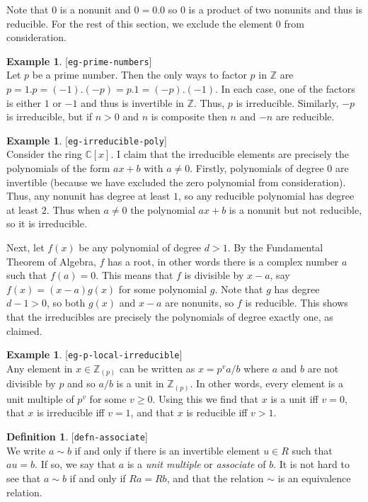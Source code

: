 \documentclass{amsart}
\newcommand{\lbl}[1]{\label{#1}\textup{[\texttt{#1}]}\ \\}
\newcommand{\lbl}{\label}
\newcommand{\C}         {{\mathbb{C}}}
\newcommand{\Z}         {{\mathbb{Z}}}
\newcommand{\Zpl}       {{\mathbb{Z}_{(p)}}}
\renewcommand{\:}{\colon}
\theoremstyle{definition}
\newtheorem{definition}[theorem]{Definition}
\newtheorem{example}[theorem]{Example}
\begin{document}
Note that $0$ is a nonunit and $0=0.0$ so $0$ is a product of two
nonunits and thus is reducible.  For the rest of this section, we
exclude the element $0$ from consideration.
\begin{example}\lbl{eg-prime-numbers}
 Let $p$ be a prime number.  Then the only ways to factor $p$ in $\Z$
 are $p=1.p=(-1).(-p)=p.1=(-p).(-1)$.  In each case, one of the
 factors is either $1$ or $-1$ and thus is invertible in $\Z$.  Thus,
 $p$ is irreducible.  Similarly, $-p$ is irreducible, but if $n>0$ and
 $n$ is composite then $n$ and $-n$ are reducible.
\end{example}
\begin{example}\lbl{eg-irreducible-poly}
 Consider the ring $\C[x]$.  I claim that the irreducible elements are
 precisely the polynomials of the form $ax+b$ with $a\neq 0$.
 Firstly, polynomials of degree $0$ are invertible (because we have
 excluded the zero polynomial from consideration).  Thus, any nonunit
 has degree at least $1$, so any reducible polynomial has degree at
 least $2$.  Thus when $a\neq 0$ the polynomial $ax+b$ is a nonunit
 but not reducible, so it is irreducible.

 Next, let $f(x)$ be any polynomial of degree $d>1$.  By the
 Fundamental Theorem of Algebra, $f$ has a root, in other words there
 is a complex number $a$ such that $f(a)=0$.  This means that $f$ is
 divisible by $x-a$, say $f(x)=(x-a)g(x)$ for some polynomial $g$.
 Note that $g$ has degree $d-1>0$, so both $g(x)$ and $x-a$ are
 nonunits, so $f$ is reducible.  This shows that the irreducibles are
 precisely the polynomials of degree exactly one, as claimed.
\end{example}
\begin{example}\lbl{eg-p-local-irreducible}
 Any element in $x\in\Zpl$ can be written as $x=p^va/b$ where $a$ and
 $b$ are not divisible by $p$ and so $a/b$ is a unit in $\Zpl$.  In
 other words, every element is a unit multiple of $p^v$ for some
 $v\geq 0$.  Using this we find that $x$ is a unit iff $v=0$, that $x$
 is irreducible iff $v=1$, and that $x$ is reducible iff $v>1$.
\end{example}

\begin{definition}\lbl{defn-associate}
 We write $a\sim b$ if and only if there is an invertible element
 $u\in R$ such that $au=b$.  If so, we say that $a$ is a \emph{unit
 multiple} or \emph{associate} of $b$.  It is not hard to see that
 $a\sim b$ if and only if $Ra=Rb$, and that the relation $\sim$ is an
 equivalence relation.
\end{definition}
\end{document}

